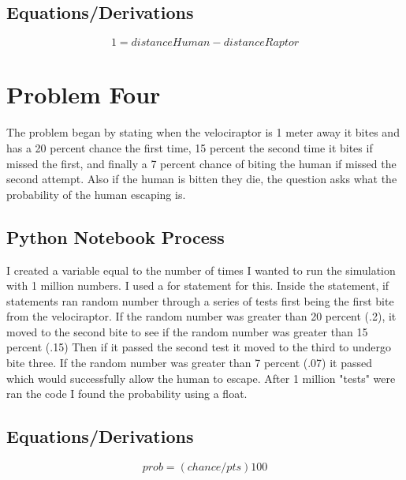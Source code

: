 \documentclass[twocolumn]{revtex4}
\begin{document}
\subsection{Equations/Derivations}
$$1 = distanceHuman - distanceRaptor$$
\section{Problem Four}
The problem began by stating when the velociraptor is 1 meter away it bites and has a 20 percent chance the first time, 15 percent the second time it bites if missed the first, and finally a 7 percent chance of biting the human if missed the second attempt. Also if the human is bitten they die, the question asks what the probability of the human escaping is.
\subsection{Python Notebook Process}
I created a variable equal to the number of times I wanted to run the simulation with 1 million numbers. I used a for statement for this. Inside the statement, if statements ran random number through a series of tests first being the first bite from the velociraptor. If the random number was greater than 20 percent (.2), it moved to the second bite to see if the random number was greater than 15 percent (.15) Then if it passed the second test it moved to the third to undergo bite three. If the random number was greater than 7 percent (.07) it passed which would successfully allow the human to escape. After 1 million "tests" were ran the code I found the probability using a float.
\subsection{Equations/Derivations}
$$prob = (chance/pts)100$$


\end{document}
